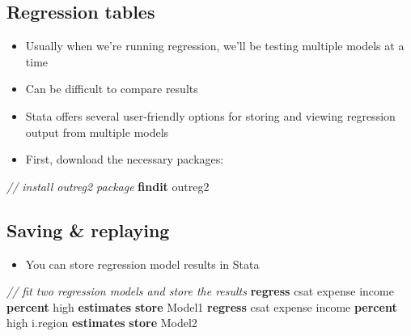 \documentclass[
]{book}
\newenvironment{Shaded}{\begin{snugshade}}{\end{snugshade}}
\newcommand{\CommentTok}[1]{\textcolor[rgb]{0.56,0.35,0.01}{\textit{#1}}}
\newcommand{\KeywordTok}[1]{\textcolor[rgb]{0.13,0.29,0.53}{\textbf{#1}}}
\newcommand{\NormalTok}[1]{#1}
\providecommand{\tightlist}{%
  \setlength{\itemsep}{0pt}\setlength{\parskip}{0pt}}
\begin{document}
\hypertarget{regression-tables}{%
\subsection{Regression tables}\label{regression-tables}}

\begin{itemize}
\tightlist
\item
  Usually when we're running regression, we'll be testing multiple models at a time
\item
  Can be difficult to compare results
\item
  Stata offers several user-friendly options for storing and viewing regression output from multiple models
\item
  First, download the necessary packages:
\end{itemize}

\begin{Shaded}
\begin{Highlighting}[]
  \CommentTok{// install outreg2 package}
  \KeywordTok{findit}\NormalTok{ outreg2}
\end{Highlighting}
\end{Shaded}

\hypertarget{saving-replaying}{%
\subsection{Saving \& replaying}\label{saving-replaying}}

\begin{itemize}
\tightlist
\item
  You can store regression model results in Stata
\end{itemize}

\begin{Shaded}
\begin{Highlighting}[]
  \CommentTok{// fit two regression models and store the results}
  \KeywordTok{regress}\NormalTok{ csat expense income }\KeywordTok{percent}\NormalTok{ high}
  \KeywordTok{estimates} \KeywordTok{store}\NormalTok{ Model1}
  \KeywordTok{regress}\NormalTok{ csat expense income }\KeywordTok{percent}\NormalTok{ high i.region}
  \KeywordTok{estimates} \KeywordTok{store}\NormalTok{ Model2}
\end{Highlighting}
\end{Shaded}
\end{document}
